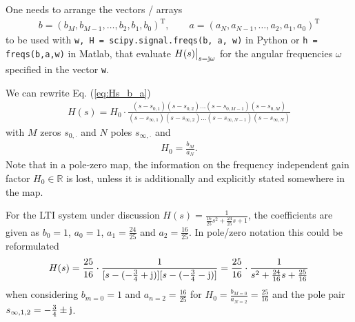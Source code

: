 \documentclass[a4paper,11pt,oneside]{scrartcl}
\newcommand{\eq}[1]{Eq. (\ref{#1})}
\begin{document}
One needs to arrange the vectors / arrays
\begin{align}
b = (b_M, b_{M-1}, \dots, b_2, b_1, b_0)^\mathrm{T}, \qquad
a = (a_N, a_{N-1}, \dots, a_2, a_1, a_0)^\mathrm{T}
\end{align}
to be used with \verb|w, H = scipy.signal.freqs(b, a, w)| in Python
or \verb|h = freqs(b,a,w)| in Matlab, that evaluate $H(s)\big|_{s=\im\omega}$ for the
angular frequencies $\omega$ specified in the vector \verb|w|.
%

We can rewrite \eq{eq:Hs_b_a}
\begin{align}
\label{eq:Hs_H0_z_p}
H(s) = H_0 \cdot \frac
{(s-s_{0,1}) (s-s_{0,2}) \dots (s-s_{0,M-1}) (s-s_{0,M})}
{(s-s_{\infty,1}) (s-s_{\infty,2}) \dots (s-s_{\infty,N-1}) (s-s_{\infty,N})}
\end{align}
with $M$ zeros $s_{0,\cdot}$ and $N$ poles $s_{\infty,\cdot}$
and
\begin{align}
H_0 = \frac{b_M}{a_N}.
\end{align}
%
Note that in a pole-zero map, the information on the frequency independent gain
factor $H_0 \in \mathbb{R}$ is lost, unless it is additionally and explicitly
stated somewhere in the map.

For the LTI system under discussion
$H(s) = \frac{1}{\frac{16}{25} s^2 + \frac{24}{25} s + 1}$,
the coefficients are given as
$b_0 = 1$, $a_0=1$, $a_1 = \frac{24}{25}$ and
$a_2 = \frac{16}{25}$.
%
In pole/zero notation this could be reformulated
\begin{align}
H(s) = \frac{25}{16}\cdot\frac{1}{[s-(-\frac{3}{4}+\im)] [s-(-\frac{3}{4}-\im)]}
=
\frac{25}{16}\cdot\frac{1}{s^2 + \frac{24}{16} s  + \frac{25}{16}}
\end{align}
when considering $b_{m=0} = 1$ and $a_{n=2}=\frac{16}{25}$ for
$H_0 = \frac{b_{M=0}}{a_{N=2}}=\frac{25}{16}$ and the pole pair
$s_{\infty,1,2} = -\frac{3}{4} \pm \im$.
\end{document}
